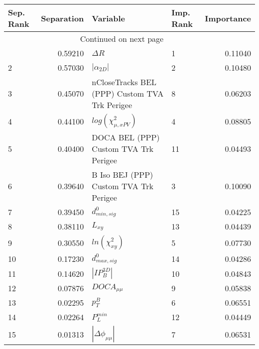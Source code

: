 \usepackage{lscape}

\begin{landscape}
\begin{longtable}{lrllr}
\toprule
Sep. Rank &  Separation &                                       Variable & Imp. Rank &  Importance \\
\midrule
\endhead
\midrule
\multicolumn{3}{r}{{Continued on next page}} \\
\midrule
\endfoot

\bottomrule
\endlastfoot
        1 &     0.59210 &                                     $\Delta R$ &         1 &     0.11040 \\
        2 &     0.57030 &                                $|\alpha_{2D}|$ &         2 &     0.10480 \\
        3 &     0.45070 &  nCloseTracks BEL (PPP) Custom TVA Trk Perigee &         8 &     0.06203 \\
        4 &     0.44100 &                      $log(\chi^{2}_{\mu,xPV})$ &         4 &     0.08805 \\
        5 &     0.40400 &          DOCA BEL (PPP) Custom TVA Trk Perigee &        11 &     0.04493 \\
        6 &     0.39640 &         B Iso BEJ (PPP) Custom TVA Trk Perigee &         3 &     0.10090 \\
        7 &     0.39450 &                               $d^0_{min, sig}$ &        15 &     0.04225 \\
        8 &     0.38110 &                                       $L_{xy}$ &        13 &     0.04439 \\
        9 &     0.30550 &                            $ln(\chi^{2}_{xy})$ &         5 &     0.07730 \\
       10 &     0.17230 &                               $d^0_{max, sig}$ &        14 &     0.04286 \\
       11 &     0.14620 &                                $|IP_{B}^{3D}|$ &        10 &     0.04843 \\
       12 &     0.07876 &                                $DOCA_{\mu\mu}$ &         9 &     0.05838 \\
       13 &     0.02295 &                                      $p^B_{T}$ &         6 &     0.06551 \\
       14 &     0.02264 &                                  $P^{min}_{L}$ &        12 &     0.04449 \\
       15 &     0.01313 &                       $|\Delta \phi_{\mu\mu}|$ &         7 &     0.06531 \\
\end{longtable}

\end{landscape}
